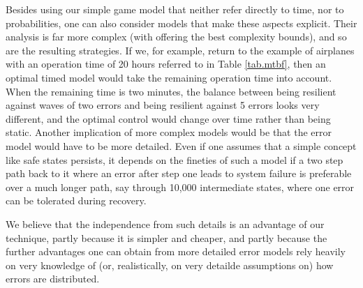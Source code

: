 \documentclass[times,10pt,twocolumn]{article}
\begin{document}
Besides using our simple game model that neither refer directly to time, nor to probabilities, one can also consider models that make these aspects explicit.
Their analysis is far more complex (with \cite{FRSZ11} offering the best complexity bounds), and so are the resulting strategies.
If we, for example, return to the example of airplanes with an operation time of 20 hours referred to in Table \ref{tab.mtbf}, then an optimal timed model would take the remaining operation time into account.
When the remaining time is two minutes, the balance between being resilient against waves of two errors and being resilient against 5 errors looks very different, and the optimal control would change over time rather than being static.
Another implication of more complex models would be that the error model would have to be more detailed.
Even if one assumes that a simple concept like safe states persists, it depends on the fineties of such a model if a two step path back to it where an error after step one leads to system failure is preferable over a much longer path, say through 10,000 intermediate states, where one error can be tolerated during recovery.

We believe that the independence from such details is an advantage of our technique, partly because it is simpler and cheaper, and partly because the further advantages one can obtain from more detailed error models rely heavily on very knowledge of (or, realistically, on very detailde assumptions on) how errors are distributed.
\label{reply1.prob.more.complex}  

\end{document}
